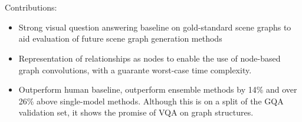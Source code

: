 \chapter*{}

Contributions:

\begin{itemize}
    \item Strong visual question answering baseline on gold-standard scene graphs to aid evaluation of future scene graph generation methods
    \item Representation of relationships as nodes to enable the use of node-based graph convolutions, with a guarante worst-case time complexity.
    \item Outperform human baseline, outperform ensemble methods by 14\% and over 26\% above single-model methods. Although this is on a split of the GQA validation set, it shows the promise of VQA on graph structures.
\end{itemize}